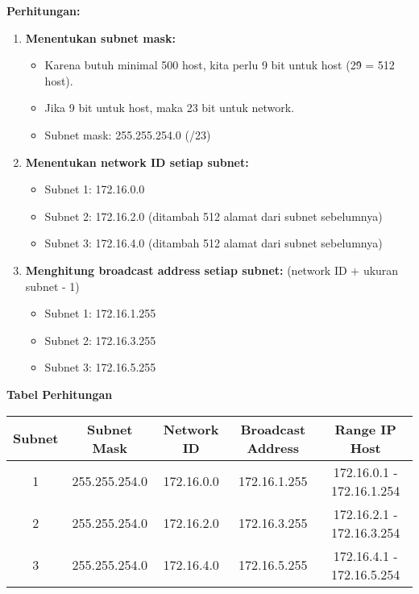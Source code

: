 \documentclass[12pt, a4paper]{article}
\begin{document}
\textbf{Perhitungan:}
\begin{enumerate}
    \item \textbf{Menentukan subnet mask:}
    \begin{itemize}
        \item Karena butuh minimal 500 host, kita perlu 9 bit untuk host (2\^9 = 512 host).
        \item Jika 9 bit untuk host, maka 23 bit untuk network.
        \item Subnet mask: 255.255.254.0 (/23)
    \end{itemize}

    \item \textbf{Menentukan network ID setiap subnet:}
    \begin{itemize}
        \item Subnet 1: 172.16.0.0
        \item Subnet 2: 172.16.2.0 (ditambah 512 alamat dari subnet sebelumnya)
        \item Subnet 3: 172.16.4.0 (ditambah 512 alamat dari subnet sebelumnya)
    \end{itemize}

    \item \textbf{Menghitung broadcast address setiap subnet:} 
    (network ID + ukuran subnet - 1)
    \begin{itemize}
        \item Subnet 1: 172.16.1.255
        \item Subnet 2: 172.16.3.255
        \item Subnet 3: 172.16.5.255
    \end{itemize}
\end{enumerate}

\textbf{Tabel Perhitungan}

\begin{center}
    \begin{tabular}{|c|c|c|c|c|}
        \hline
        \textbf{Subnet} & \textbf{Subnet Mask} & \textbf{Network ID} & \textbf{Broadcast Address} & \textbf{Range IP Host} \\
        \hline
        1 & 255.255.254.0 & 172.16.0.0 & 172.16.1.255 & 172.16.0.1 - 172.16.1.254 \\
        \hline
        2 & 255.255.254.0 & 172.16.2.0 & 172.16.3.255 & 172.16.2.1 - 172.16.3.254 \\
        \hline
        3 & 255.255.254.0 & 172.16.4.0 & 172.16.5.255 & 172.16.4.1 - 172.16.5.254 \\
        \hline
    \end{tabular}
\end{center}
\end{document}
